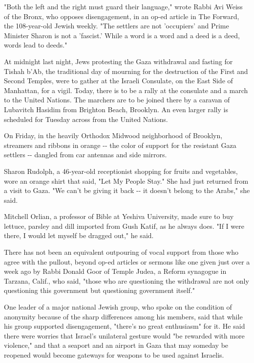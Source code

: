 "Both the left and the right must guard their language," wrote Rabbi Avi
Weiss of the Bronx, who opposes disengagement, in an op-ed article in
The Forward, the 108-year-old Jewish weekly. "The settlers are not
'occupiers' and Prime Minister Sharon is not a 'fascist.' While a word
is a word and a deed is a deed, words lead to deeds."

At midnight last night, Jews protesting the Gaza withdrawal and fasting
for Tishah b'Ab, the traditional day of mourning for the destruction of
the First and Second Temples, were to gather at the Israeli Consulate,
on the East Side of Manhattan, for a vigil. Today, there is to be a
rally at the consulate and a march to the United Nations. The marchers
are to be joined there by a caravan of Lubavitch Hasidim from Brighton
Beach, Brooklyn. An even larger rally is scheduled for Tuesday across
from the United Nations.

On Friday, in the heavily Orthodox Midwood neighborhood of Brooklyn,
streamers and ribbons in orange -\/- the color of support for the
resistant Gaza settlers -\/- dangled from car antennas and side mirrors.

Sharon Rudolph, a 46-year-old receptionist shopping for fruits and
vegetables, wore an orange shirt that said, "Let My People Stay." She
had just returned from a visit to Gaza. "We can't be giving it back -\/-
it doesn't belong to the Arabs," she said.

Mitchell Orlian, a professor of Bible at Yeshiva University, made sure
to buy lettuce, parsley and dill imported from Gush Katif, as he always
does. "If I were there, I would let myself be dragged out," he said.

There has not been an equivalent outpouring of vocal support from those
who agree with the pullout, beyond op-ed articles or sermons like one
given just over a week ago by Rabbi Donald Goor of Temple Judea, a
Reform synagogue in Tarzana, Calif., who said, "those who are
questioning the withdrawal are not only questioning this government but
questioning government itself."

One leader of a major national Jewish group, who spoke on the condition
of anonymity because of the sharp differences among his members, said
that while his group supported disengagement, "there's no great
enthusiasm" for it. He said there were worries that Israel's unilateral
gesture would "be rewarded with more violence," and that a seaport and
an airport in Gaza that may someday be reopened would become gateways
for weapons to be used against Israelis.

